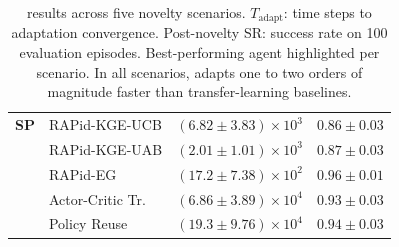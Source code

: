 \begin{table}[htbp]
\begin{tabular}{l l c c}
\midrule
\textbf{SP}
  & RAPid-KGE-UCB     & $(6.82 \pm 3.83) \times 10^3$ & $0.86 \pm 0.03$ \\
  & RAPid-KGE-UAB     & $(2.01 \pm 1.01) \times 10^3$ & $0.87 \pm 0.03$ \\
  & RAPid-EG          & $(17.2 \pm 7.38) \times 10^2$ & $0.96 \pm 0.01$ \\
  & Actor-Critic Tr.  & $(6.86 \pm 3.89) \times 10^4$ & $0.93 \pm 0.03$ \\
  & Policy Reuse      & $(19.3 \pm 9.76) \times 10^4$ & $0.94 \pm 0.03$ \\
\bottomrule
\end{tabular}
\caption[\RAPidLearn{} adaptation across five novelty scenarios]{\RAPidLearn{} results across five novelty scenarios. $T_\text{adapt}$: time steps to adaptation convergence. Post-novelty SR: success rate on 100 evaluation episodes. Best-performing agent highlighted per scenario. In all scenarios, \RAPidLearn{} adapts one to two orders of magnitude faster than transfer-learning baselines.}
\label{tab:rapid_learn_results}
\end{table}

